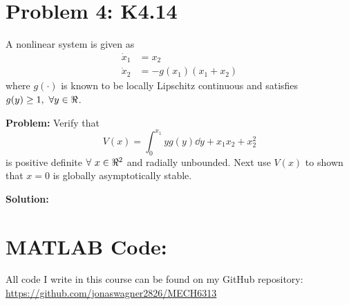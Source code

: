 \documentclass[letter]{article}
\begin{document}
\newpage
\section{Problem 4: K4.14}
A nonlinear system is given as
\begin{equation}
	\begin{aligned}
		\dot{x}_1 &= x_2\\
		\dot{x}_2 &= -g(x_1) (x_1 + x_2)
	\end{aligned}
\end{equation}
where $g(\cdot)$ is known to be locally Lipschitz continuous and satisfies $g(y) \geq 1, \ \forall y \in \real$.

\noindent
\textbf{Problem:}
Verify that
\begin{equation}
	V(x) = \int_0^{x_1} y g(y) \dd{y} + x_1 x_2 + x_2^2
\end{equation}
is positive  definite $\forall \ x \in \real^2$ and radially unbounded. Next use $V(x)$ to shown that $x=0$ is globally asymptotically stable.

\noindent
\textbf{Solution:}












\newpage
\appendix
\section{MATLAB Code:}\label{apx:matlab}
All code I write in this course can be found on my GitHub repository:\\
\href{https://github.com/jonaswagner2826/MECH6313}{https://github.com/jonaswagner2826/MECH6313}
%
\end{document}
